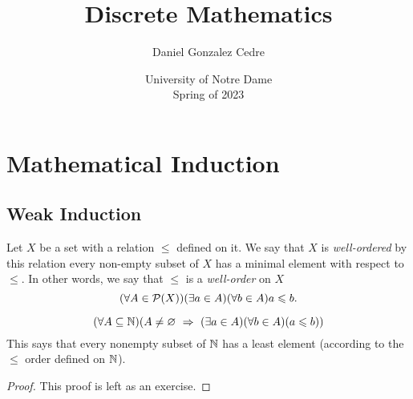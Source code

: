 







\title{Discrete Mathematics}
\author{Daniel Gonzalez Cedre}
\date{University of Notre Dame \\ Spring of 2023}
\maketitle

\setcounter{chapter}{3}
\chapter{Mathematical Induction}

\section{Weak Induction}

\begin{definition}
    Let $X$ be a set with a relation $\leq$ defined on it.
    We say that $X$ is \emph{well-ordered} by this relation \ifandonlyif
    every non-empty subset of $X$ has a minimal element with respect to $\leq$.
    In other words, we say that $\leq$ is a \emph{well-order} on $X$
    \iffbydefn
    \[
        \pn*{\forall A \in \power{X}}\pn*{\exists a \in A}\pn*{\forall b \in A}{a \leq b}.
    \]
\end{definition}

\begin{theorem}\label{thm:lep}
    \vspace{-\parskip}
    \[
        \pn*{\forall A \subseteq \N}\pn*{A \neq \emptyset \implies \pn*{\exists a \in A}\pn*{\forall b \in A}\pn*{a \leq b}}
    \]
    This says that every nonempty subset of $\mathbb{N}$ has a least element
    (according to the $\leq$ order defined on $\mathbb{N}$).
\end{theorem}
\begin{proof}
    This proof is left as an exercise.
\end{proof}

